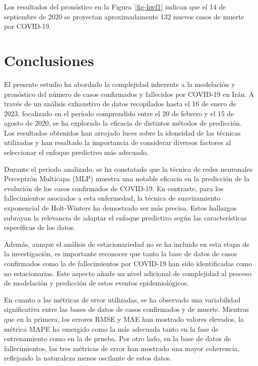 \documentclass[
  us-letterpaper,
]{scrreprt}
\theoremstyle{definition}
\theoremstyle{plain}
\theoremstyle{plain}
\theoremstyle{definition}
\theoremstyle{remark}
\begin{document}
Los resultados del pronóstico en la Figura~\ref{fig-hwf1} indican que el
14 de septiembre de 2020 se proyectan aproximadamente 132 nuevos casos
de muerte por COVID-19.


\chapter{Conclusiones}\label{conclusiones}

El presente estudio ha abordado la complejidad inherente a la modelación
y pronóstico del número de casos confirmados y fallecidos por COVID-19
en Irán. A través de un análisis exhaustivo de datos recopilados hasta
el 16 de enero de 2023, focalizado en el período comprendido entre el 20
de febrero y el 15 de agosto de 2020, se ha explorado la eficacia de
distintos métodos de predicción. Los resultados obtenidos han arrojado
luces sobre la idoneidad de las técnicas utilizadas y han resaltado la
importancia de considerar diversos factores al seleccionar el enfoque
predictivo más adecuado.

Durante el periodo analizado, se ha constatado que la técnica de redes
neuronales Perceptrón Multicapa (MLP) muestra una notable eficacia en la
predicción de la evolución de los casos confirmados de COVID-19. En
contraste, para los fallecimientos asociados a esta enfermedad, la
técnica de suavizamiento exponencial de Holt-Winters ha demostrado ser
más precisa. Estos hallazgos subrayan la relevancia de adaptar el
enfoque predictivo según las características específicas de los datos.

Además, aunque el análisis de estacionariedad no se ha incluido en esta
etapa de la investigación, es importante reconocer que tanto la base de
datos de casos confirmados como la de fallecimientos por COVID-19 han
sido identificadas como no estacionarias. Este aspecto añade un nivel
adicional de complejidad al proceso de modelación y predicción de estos
eventos epidemiológicos.

En cuanto a las métricas de error utilizadas, se ha observado una
variabilidad significativa entre las bases de datos de casos confirmados
y de muerte. Mientras que en la primera, los errores RMSE y MAE han
mostrado valores elevados, la métrica MAPE ha emergido como la más
adecuada tanto en la fase de entrenamiento como en la de prueba. Por
otro lado, en la base de datos de fallecimientos, las tres métricas de
error han mostrado una mayor coherencia, reflejando la naturaleza menos
oscilante de estos datos.
\end{document}
